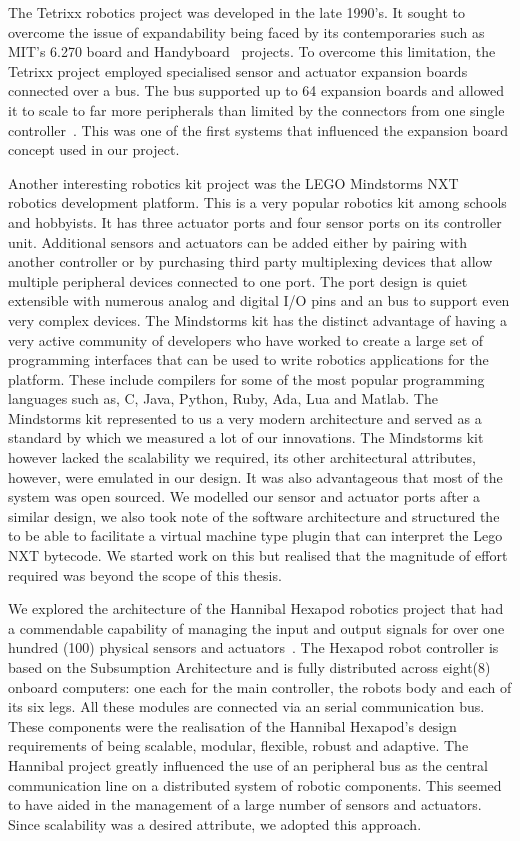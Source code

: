 The Tetrixx robotics project was developed in the late 1990's. It sought to overcome the issue of expandability being faced by its contemporaries such as MIT's 6.270 board and Handyboard~\parencite{handy} projects. To overcome this limitation, the Tetrixx project employed specialised sensor and actuator expansion boards connected over a bus. The bus supported up to 64 expansion boards and allowed it to scale to far more peripherals than limited by the connectors from one single controller~\parencite{tetrixx}. This was one of the first systems that influenced the expansion board concept used in our project.

Another interesting robotics kit project was the LEGO Mindstorms NXT robotics development platform. This is a very popular robotics kit among schools and hobbyists. It has three actuator ports and four sensor ports on its controller unit. Additional sensors and actuators can be added either by pairing with another controller or by purchasing third party multiplexing devices that allow multiple peripheral devices connected to one port. The port design is quiet extensible with numerous analog and digital I/O pins and an \iic bus to support even very complex devices. The Mindstorms kit has the distinct advantage of having a very active community of developers who have worked to create a large set of programming interfaces that can be used to write robotics applications for the platform. These include compilers for some of the most popular programming languages such as, C, Java, Python, Ruby, Ada, Lua and Matlab. The Mindstorms kit represented to us a very modern architecture and served as a standard by which we measured a lot of our innovations. The Mindstorms kit however lacked the scalability we required, its other architectural attributes, however, were emulated in our design. It was also advantageous that most of the system was open sourced. We modelled our sensor and actuator ports after a similar design, we also took note of the software architecture and structured the \xten to be able to facilitate a virtual machine type plugin that can interpret the Lego NXT bytecode. We started work on this but realised that the magnitude of effort required was beyond the scope of this thesis.

We explored the architecture of the Hannibal Hexapod robotics project that had a commendable capability of managing the input and output signals for over one hundred (100) physical sensors and actuators~\parencite{hannibal}. The Hexapod robot controller is based on the Subsumption Architecture and is fully distributed across eight(8) onboard computers: one each for the main controller, the robots body and each of its six legs. All these modules are connected via an \iic serial communication bus. These components were the realisation of the Hannibal Hexapod's design requirements of being scalable, modular, flexible, robust and adaptive. The Hannibal project greatly influenced the use of an \iic peripheral bus as the central communication line on a distributed system of robotic components. This seemed to have aided in the management of a large number of sensors and actuators. Since scalability was a desired attribute, we adopted this approach.

